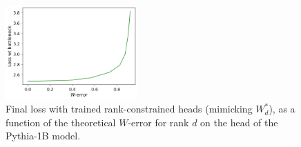 \begin{figure}
\centering
    \includegraphics[width=0.45\textwidth]{sources/part_1/softmax_bottleneck/imgs/loss_v_werr.png}
    \caption{Final loss with trained rank-constrained heads (mimicking $W_d^*$), as a function of the theoretical $W$-error for rank $d$ on the head of the Pythia-1B model.}
    \vspace{-10pt}

    \label{fig:neg_res_thm}
\end{figure}








